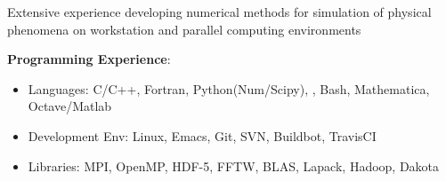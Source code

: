 Extensive experience developing numerical methods for simulation of physical phenomena
on workstation and parallel computing environments

\blankline

\textbf{Programming Experience}: 
\begin{itemize}
\itemsep 0pt
\item Languages: C/C++, Fortran, Python(Num/Scipy), \Latex{}, Bash, Mathematica, Octave/Matlab
\item Development Env: Linux, Emacs, Git, SVN, Buildbot, TravisCI
\item Libraries: MPI, OpenMP, HDF-5, FFTW, BLAS, Lapack, Hadoop, Dakota
\end{itemize}

